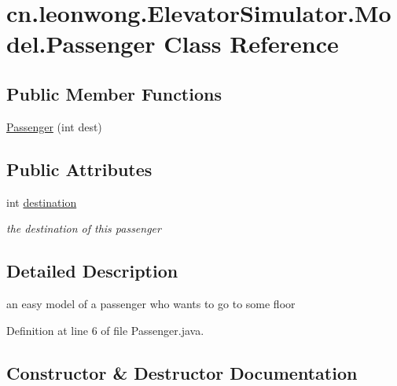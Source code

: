 \hypertarget{classcn_1_1leonwong_1_1_elevator_simulator_1_1_model_1_1_passenger}{}\section{cn.\+leonwong.\+Elevator\+Simulator.\+Model.\+Passenger Class Reference}
\label{classcn_1_1leonwong_1_1_elevator_simulator_1_1_model_1_1_passenger}
\subsection*{Public Member Functions}
\begin{DoxyCompactItemize}
\item 
\hyperlink{classcn_1_1leonwong_1_1_elevator_simulator_1_1_model_1_1_passenger_a1cf67fc003a32950fc5651965fd6e870}{Passenger} (int dest)
\end{DoxyCompactItemize}
\subsection*{Public Attributes}
\begin{DoxyCompactItemize}
\item 
int \hyperlink{classcn_1_1leonwong_1_1_elevator_simulator_1_1_model_1_1_passenger_aedd16227b36632abd3c74bb311993847}{destination}
\begin{DoxyCompactList}\small\item\em the destination of this passenger \end{DoxyCompactList}\end{DoxyCompactItemize}


\subsection{Detailed Description}
an easy model of a passenger who wants to go to some floor 

Definition at line 6 of file Passenger.\+java.



\subsection{Constructor \& Destructor Documentation}
\mbox{\label{classcn_1_1leonwong_1_1_elevator_simulator_1_1_model_1_1_passenger_a1cf67fc003a32950fc5651965fd6e870}} 
